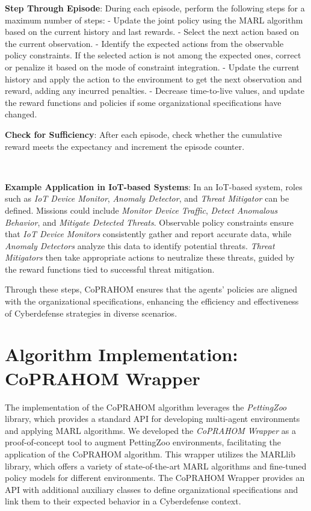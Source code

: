\documentclass[conference]{IEEEtran}
\begin{document}
\textbf{Step Through Episode}:
During each episode, perform the following steps for a maximum number of steps:
  - Update the joint policy using the MARL algorithm based on the current history and last rewards.
  - Select the next action based on the current observation.
  - Identify the expected actions from the observable policy constraints. If the selected action is not among the expected ones, correct or penalize it based on the mode of constraint integration.
  - Update the current history and apply the action to the environment to get the next observation and reward, adding any incurred penalties.
  - Decrease time-to-live values, and update the reward functions and policies if some organizational specifications have changed.

\textbf{Check for Sufficiency}:
After each episode, check whether the cumulative reward meets the expectancy and increment the episode counter.

\

\noindent \textbf{Example Application in IoT-based Systems}: In an IoT-based system, roles such as \textit{IoT Device Monitor}, \textit{Anomaly Detector}, and \textit{Threat Mitigator} can be defined. Missions could include \textit{Monitor Device Traffic}, \textit{Detect Anomalous Behavior}, and \textit{Mitigate Detected Threats}. Observable policy constraints ensure that \textit{IoT Device Monitors} consistently gather and report accurate data, while \textit{Anomaly Detectors} analyze this data to identify potential threats. \textit{Threat Mitigators} then take appropriate actions to neutralize these threats, guided by the reward functions tied to successful threat mitigation.

Through these steps, CoPRAHOM ensures that the agents' policies are aligned with the organizational specifications, enhancing the efficiency and effectiveness of Cyberdefense strategies in diverse scenarios.


\section{Algorithm Implementation: CoPRAHOM Wrapper}\label{sec:coprahom_wrapper}

The implementation of the CoPRAHOM algorithm leverages the \emph{PettingZoo} library, which provides a standard API for developing multi-agent environments and applying MARL algorithms. We developed the \textit{CoPRAHOM Wrapper} as a proof-of-concept tool to augment PettingZoo environments, facilitating the application of the CoPRAHOM algorithm. This wrapper utilizes the MARLlib~\cite{hu2022marllib} library, which offers a variety of state-of-the-art MARL algorithms and fine-tuned policy models for different environments. The CoPRAHOM Wrapper provides an API with additional auxiliary classes to define organizational specifications and link them to their expected behavior in a Cyberdefense context.
\end{document}
